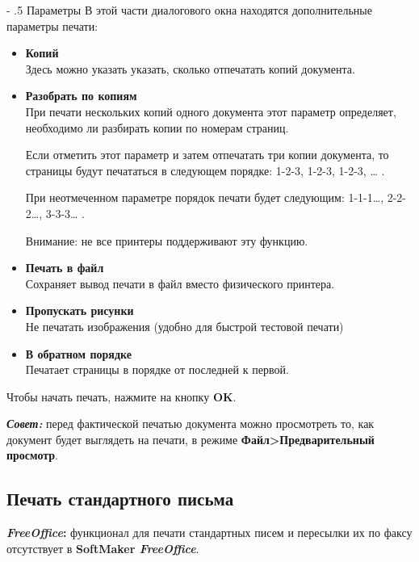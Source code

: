 ﻿\documentclass[a4paper,10pt]{article}
\makeatletter
\renewcommand\paragraph{%
   \@startsection{paragraph}{4}{0mm}%
      {-\baselineskip}%
      {.5\baselineskip}%
      {\normalfont\normalsize\bfseries}}
\makeatother
\begin{document}
\paragraph{Параметры}
В этой части диалогового окна находятся дополнительные параметры печати:
\begin{itemize}
 \item \textbf{Копий}\\
 Здесь можно указать указать, сколько отпечатать копий документа.
 \item \textbf{Разобрать по копиям}\\
 При печати нескольких копий одного документа этот параметр определяет, необходимо ли разбирать копии по номерам страниц.
 
 Если отметить этот параметр и затем отпечатать три копии документа, то страницы будут печататься в следующем порядке: 1-2-3, 1-2-3, 1-2-3, … .
 
 При неотмеченном параметре порядок печати будет следующим: 1-1-1…, 2-2-2…, 3-3-3… .
 
 Внимание: не все принтеры поддерживают эту функцию.
 \item \textbf{Печать в файл}\\
 Сохраняет вывод печати в файл вместо физического принтера.
 \item \textbf{Пропускать рисунки}\\
 Не печатать изображения (удобно для быстрой тестовой печати)
 \item \textbf{В обратном порядке}\\
 Печатает страницы в порядке от последней к первой.
 \end{itemize}

 Чтобы начать печать, нажмите на кнопку \textbf{OK}.
 
 \begin{mdframed}[backgroundcolor=blue!10]
\textbf{\textit{Совет:}} перед фактической печатью документа можно просмотреть то, как документ будет выглядеть на печати, в режиме \textbf{Файл>Предварительный просмотр}.
\end{mdframed}

\subsection{Печать стандартного письма}
 \begin{mdframed}[backgroundcolor=pink!50]
\textbf{\textit{FreeOffice}:} функционал для печати стандартных писем и пересылки их по факсу отсутствует в \textbf{SoftMaker \textit{FreeOffice}}.
\end{mdframed}
\end{document}
